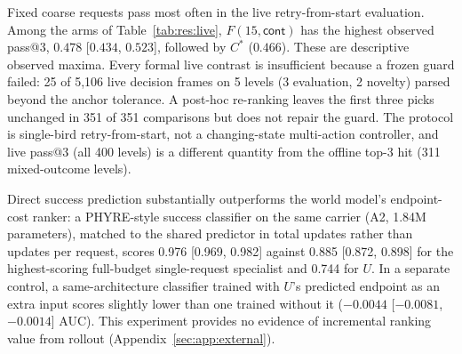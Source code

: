 \begin{revblock}
\nopagebreak
Fixed coarse requests pass most often in the live retry-from-start evaluation. Among the arms of Table~\ref{tab:res:live}, $F(15,\textsf{cont})$ has the highest observed pass@3, $0.478$ [$0.434$, $0.523$], followed by $C^{*}$ ($0.466$). These are descriptive observed maxima. Every formal live contrast is insufficient because a frozen guard failed: 25 of 5,106 live decision frames on 5 levels (3 evaluation, 2 novelty) parsed beyond the anchor tolerance. A post-hoc re-ranking leaves the first three picks unchanged in 351 of 351 comparisons but does not repair the guard. The protocol is single-bird retry-from-start, not a changing-state multi-action controller, and live pass@3 (all 400 levels) is a different quantity from the offline top-3 hit (311 mixed-outcome levels).

Direct success prediction substantially outperforms the world model's endpoint-cost ranker: a PHYRE-style success classifier \citep{bakhtin2019phyre} on the same carrier (A2, 1.84M parameters), matched to the shared predictor in total updates rather than updates per request, scores 0.976 [0.969, 0.982] against 0.885 [0.872, 0.898] for the highest-scoring full-budget single-request specialist and 0.744 for $U$. In a separate control, a same-architecture classifier trained with $U$'s predicted endpoint as an extra input scores slightly lower than one trained without it ($-0.0044$ [$-0.0081$, $-0.0014$] AUC). This experiment provides no evidence of incremental ranking value from rollout (Appendix~\ref{sec:app:external}).
\end{revblock}
